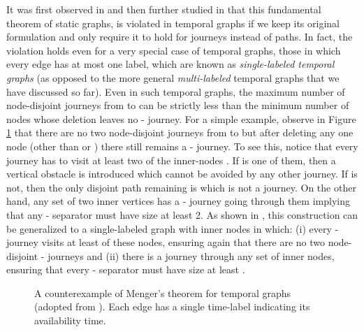 \documentclass[oribibl, 11pt]{llncs}
\begin{document}
It was first observed in \cite{Be96} and then further studied in \cite{KKK00} that this fundamental theorem of static graphs, is violated in temporal graphs if we keep its original formulation and only require it to hold for journeys instead of paths. In fact, the violation holds even for a very special case of temporal graphs, those in which every edge has at most one label, which are known as \emph{single-labeled temporal graphs} (as opposed to the more general \emph{multi-labeled} temporal graphs that we have discussed so far). Even in such temporal graphs, the maximum number of node-disjoint journeys from  to  can be strictly less than the minimum number of nodes whose deletion leaves no - journey. For a simple example, observe in Figure \ref{fig:ber} that there are no two node-disjoint journeys from  to  but after deleting any one node (other than  or ) there still remains a - journey. To see this, notice that every journey has to visit at least two of the inner-nodes . If  is one of them, then a vertical obstacle is introduced which cannot be avoided by any other journey. If  is not, then the only disjoint path remaining is  which is not a journey. On the other hand, any set of two inner vertices has a - journey going through them implying that any - separator must have size at least 2. As shown in \cite{KKK00}, this construction can be generalized to a single-labeled graph with  inner nodes in which: (i) every - journey visits at least  of these nodes, ensuring again that there are no two node-disjoint - journeys and (ii) there is a journey through any set of  inner nodes, ensuring that every - separator must have size at least .

\begin{figure}[!hbtp]
   \caption{A counterexample of Menger's theorem for temporal graphs (adopted from \cite{KKK00}). Each edge has a single time-label indicating its availability time.} \label{fig:ber}
\end{figure} 
\end{document}
